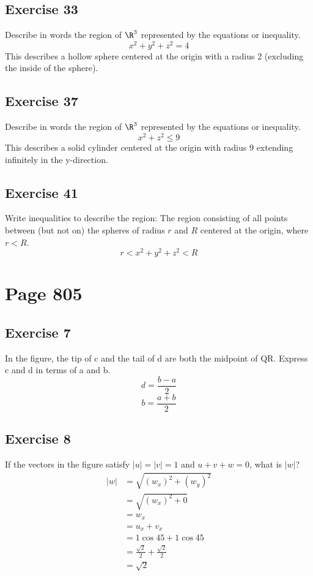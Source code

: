 \documentclass[letterpaper, 12pt]{math}
\begin{document}
\subsection*{Exercise 33}
Describe in words the region of \( \R^3 \) represented by the equations or
inequality.
\[ x^2+y^2+z^2 = 4 \]
This describes a hollow sphere centered at the origin with a radius 2 (excluding
the inside of the sphere).

\subsection*{Exercise 37}
Describe in words the region of \( \R^3 \) represented by the equations or
inequality.
\[ x^2+z^2\le 9 \]
This describes a solid cylinder centered at the origin with radius 9 extending
infinitely in the y-direction.

\subsection*{Exercise 41}
Write inequalities to describe the region: The region consisting of all points
between (but not on) the spheres of radius \( r \) and \( R \) centered at the
origin, where \( r < R \).
\[ r < x^2+y^2+z^2 < R \]

\section*{Page 805}

\subsection*{Exercise 7}
In the figure, the tip of c and the tail of d are both the midpoint
of QR. Express c and d in terms of a and b.
\[ d = \frac{b-a}{2} \]
\[ b = \frac{a+b}{2} \]

\subsection*{Exercise 8}
If the vectors in the figure satisfy \( |u| = |v|= 1 \) and \( u+v+w = 0 \),
what is \( |w| \)?
\begin{align*}
  |w| &= \sqrt{(w_x)^2+(w_y)^2} \\
  &= \sqrt{(w_x)^2+0} \\
  &= w_x \\
  &= u_x+v_x \\
  &= 1\cos45+1\cos45 \\
  &= \frac{\sqrt{2}}{2}+\frac{\sqrt{2}}{2} \\
  &= \sqrt{2}
\end{align*}
\end{document}
